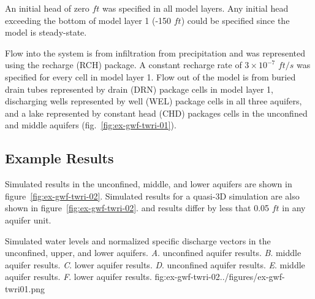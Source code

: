 An initial head of zero $ft$ was specified in all model layers. Any initial head exceeding the bottom of model layer 1 (-150 $ft$) could be specified since the model is steady-state.

Flow into the system is from infiltration from precipitation and was represented using the recharge (RCH) package. A constant recharge rate of $3 \times 10^{-7}$ $ft/s$ was specified for every cell in model layer 1. Flow out of the model is from buried drain tubes represented by drain (DRN) package cells in model layer 1, discharging wells represented by well (WEL) package cells in all three aquifers, and a lake represented by constant head (CHD) packages cells in the unconfined and middle aquifers (fig.~\ref{fig:ex-gwf-twri-01}).

\subsection{Example Results}

Simulated results in the unconfined, middle, and lower aquifers are shown in figure~\ref{fig:ex-gwf-twri-02}. Simulated results for a quasi-3D \mff simulation are also shown in figure~\ref{fig:ex-gwf-twri-02}. \mf and \mff results differ by less that 0.05 $ft$ in any aquifer unit.

\begin{StandardFigure}{
                                     Simulated water levels and normalized specific discharge vectors in 
                                     the unconfined, upper, and lower aquifers. 
                                     \textit{A}. \mf unconfined aquifer results.
                                     \textit{B}. \mf middle aquifer results.
                                     \textit{C}. \mf lower aquifer results.
                                     \textit{D}. \mff unconfined aquifer results.
                                     \textit{E}. \mff middle aquifer results.
                                     \textit{F}. \mff lower aquifer results.
                                     }{fig:ex-gwf-twri-02}{../figures/ex-gwf-twri01.png}
\end{StandardFigure}                                 

